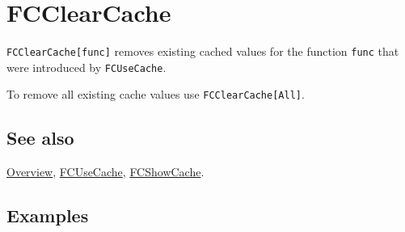 \documentclass[../FeynCalcManual.tex]{subfiles}
\begin{document}
\hypertarget{fcclearcache}{%
\section{FCClearCache}\label{fcclearcache}}

\texttt{FCClearCache[\allowbreak{}func]} removes existing cached values
for the function \texttt{func} that were introduced by
\texttt{FCUseCache}.

To remove all existing cache values use
\texttt{FCClearCache[\allowbreak{}All]}.

\subsection{See also}

\hyperlink{toc}{Overview}, \hyperlink{fcusecache}{FCUseCache},
\hyperlink{fcshowcache}{FCShowCache}.

\subsection{Examples}
\end{document}
